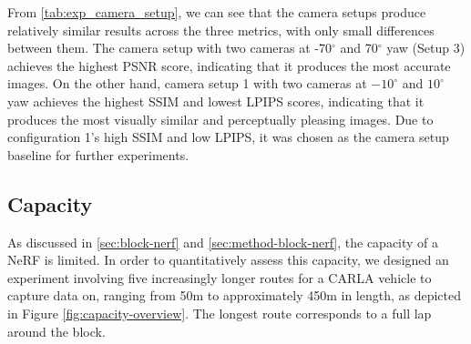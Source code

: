 From \autoref{tab:exp_camera_setup}, we can see that the camera setups produce relatively similar results across the three metrics, with only small differences between them. The camera setup with two cameras at -70$^{\circ}$ and 70$^{\circ}$ yaw (Setup 3) achieves the highest PSNR score, indicating that it produces the most accurate images. On the other hand, camera setup 1 with two cameras at $-10^{\circ}$ and $10^{\circ}$ yaw achieves the highest SSIM and lowest LPIPS scores, indicating that it produces the most visually similar and perceptually pleasing images. Due to configuration 1's high SSIM and low LPIPS, it was chosen as the camera setup baseline for further experiments.












\subsection{Capacity} \label{sec:exp-capacity}
As discussed in \autoref{sec:block-nerf} and \autoref{sec:method-block-nerf}, the capacity of a NeRF is limited. In order to quantitatively assess this capacity, we designed an experiment involving five increasingly longer routes for a CARLA vehicle to capture data on, ranging from 50m to approximately 450m in length, as depicted in Figure \ref{fig:capacity-overview}. The longest route corresponds to a full lap around the block.


